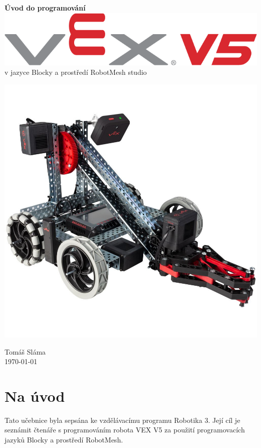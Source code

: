 


\begin{titlepage}
    \begin{center}
        \vspace*{3em}
        \Huge
				\textbf{Úvod do programování} \includegraphics[height=0.65\baselineskip]{Images/vex-logo.png}
				\\
				\Large
        \vspace*{0.5em}
				v jazyce Blocky a prostředí RobotMesh studio

        \vfill
				\includegraphics[width=0.7\linewidth]{Images/robot.jpg}
        \vfill

        \flushright
        \normalsize
				Tomáš Sláma\\
				\today
    \end{center}
\end{titlepage}

\tableofcontents
\clearpage

\setcounter{secnumdepth}{0}
\section{Na úvod}
Tato učebnice byla sepsána ke vzdělávacímu programu Robotika 3. Její cíl je seznámit čtenáře s programováním robota VEX V5 za použití programovacích jazyků Blocky a prostředí RobotMesh.

